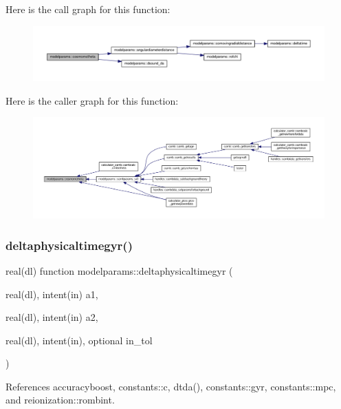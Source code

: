 Here is the call graph for this function\+:
\nopagebreak
\begin{figure}[H]
\begin{center}
\leavevmode
\includegraphics[width=350pt]{namespacemodelparams_ab4a4cc860939dbbdc0236048b5f9457e_cgraph}
\end{center}
\end{figure}
Here is the caller graph for this function\+:
\nopagebreak
\begin{figure}[H]
\begin{center}
\leavevmode
\includegraphics[width=350pt]{namespacemodelparams_ab4a4cc860939dbbdc0236048b5f9457e_icgraph}
\end{center}
\end{figure}
\mbox{\label{namespacemodelparams_ac094d31babe3489387c12a3c2ab05549}} 
\subsubsection{\texorpdfstring{deltaphysicaltimegyr()}{deltaphysicaltimegyr()}}
{\footnotesize\ttfamily real(dl) function modelparams\+::deltaphysicaltimegyr (\begin{DoxyParamCaption}\item[{real(dl), intent(in)}]{a1,  }\item[{real(dl), intent(in)}]{a2,  }\item[{real(dl), intent(in), optional}]{in\+\_\+tol }\end{DoxyParamCaption})}



References accuracyboost, constants\+::c, dtda(), constants\+::gyr, constants\+::mpc, and reionization\+::rombint.



